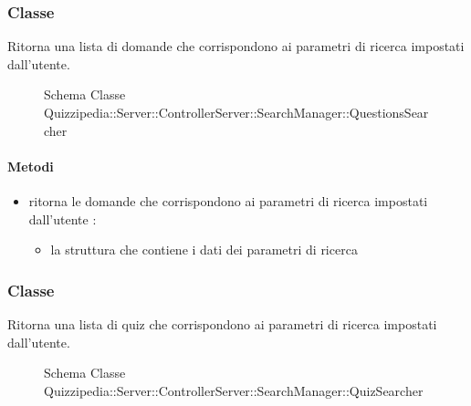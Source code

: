 \subsubsection{Classe }
Ritorna una lista di domande che corrispondono ai parametri di ricerca impostati dall'utente.
\begin{figure}[H]
\centering
\noindent{}
\caption[Schema Classe QuestionsSearcher]{Schema Classe Quizzipedia::Server::ControllerServer::SearchManager::QuestionsSearcher}
\end{figure}
\paragraph{Metodi}
\begin{itemize}
\item {}
\newline
ritorna le domande che corrispondono ai parametri di ricerca impostati dall'utente
\newline
{} :
\begin{itemize}
\item {}
\newline
la struttura che contiene i dati dei parametri di ricerca
\end{itemize}
\end{itemize}
\subsubsection{Classe }
Ritorna una lista di quiz che corrispondono ai parametri di ricerca impostati dall'utente.
\begin{figure}[H]
\centering
\noindent{}
\caption[Schema Classe QuizSearcher]{Schema Classe Quizzipedia::Server::ControllerServer::SearchManager::QuizSearcher}
\end{figure}
